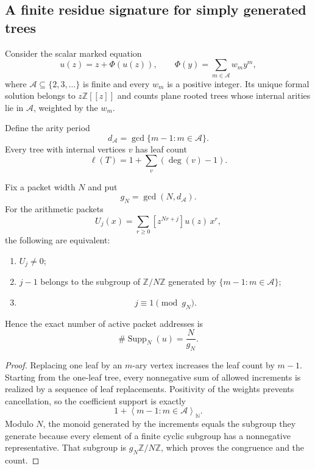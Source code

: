 \subsection{A finite residue signature for simply generated trees}
\label{subsec:block11-tree-signature}

Consider the scalar marked equation
\[
 \boxed{
 u(z)=z+\Phi(u(z)),
 \qquad
 \Phi(y)=\sum_{m\in\mathcal A}w_my^m,}
 \tag{11.8}
\]
where $\mathcal A\subseteq\{2,3,\ldots\}$ is finite and every $w_m$ is a positive integer.  Its unique formal solution belongs to $z\mathbb Z[[z]]$ and counts plane rooted trees whose internal arities lie in $\mathcal A$, weighted by the $w_m$.

Define the arity period
\[
 \boxed{
 d_{\mathcal A}
 =
 \gcd\{m-1:m\in\mathcal A\}.}
 \tag{11.9}
\]
Every tree with internal vertices $v$ has leaf count
\[
 \ell(T)=1+\sum_{v}(\deg(v)-1).
\]

\begin{theorem}
\label{thm:block11-tree-address}
Fix a packet width $N$ and put
\[
 g_N=\gcd(N,d_{\mathcal A}).
\]
For the arithmetic packets
\[
 U_j(x)=\sum_{r\ge0}[z^{Nr+j}]u(z)\,x^r,
\]
the following are equivalent:
\begin{enumerate}
\item $U_j\neq0$;
\item $j-1$ belongs to the subgroup of $\mathbb Z/N\mathbb Z$ generated by $\{m-1:m\in\mathcal A\}$;
\item
\[
 \boxed{j\equiv1\pmod{g_N}.}
\]
\end{enumerate}
Hence the exact number of active packet addresses is
\[
 \boxed{
 \#\operatorname{Supp}_N(u)=\frac{N}{g_N}.}
 \tag{11.10}
\]
\end{theorem}

\begin{proof}
Replacing one leaf by an $m$-ary vertex increases the leaf count by $m-1$.  Starting from the one-leaf tree, every nonnegative sum of allowed increments is realized by a sequence of leaf replacements.  Positivity of the weights prevents cancellation, so the coefficient support is exactly
\[
 1+\left\langle m-1:m\in\mathcal A\right\rangle_{\mathbb N}.
\]
Modulo $N$, the monoid generated by the increments equals the subgroup they generate because every element of a finite cyclic subgroup has a nonnegative representative.  That subgroup is $g_N\mathbb Z/N\mathbb Z$, which proves the congruence and the count.
\end{proof}

